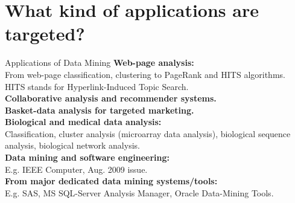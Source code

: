 \section{What kind of applications are targeted?}

\begin{frame}{Applications of Data Mining}
	\textbf{Web-page analysis:}\\
	From web-page classification, clustering to PageRank and HITS algorithms.\\
	HITS stands for Hyperlink-Induced Topic Search.\\[0.2cm]
	\textbf{Collaborative analysis and recommender systems.}\\
	\textbf{Basket-data analysis for targeted marketing.}\\
	\textbf{Biological and medical data analysis:}\\
	Classification, cluster analysis (microarray data analysis), biological 
	sequence analysis, biological network analysis.\\[0.2cm]
	\textbf{Data mining and software engineering:}\\
	E.g. IEEE Computer, Aug. 2009 issue.\\
	\textbf{From major dedicated data mining systems/tools:}\\
	E.g. SAS, MS SQL-Server Analysis Manager, Oracle Data-Mining Tools.
\end{frame}